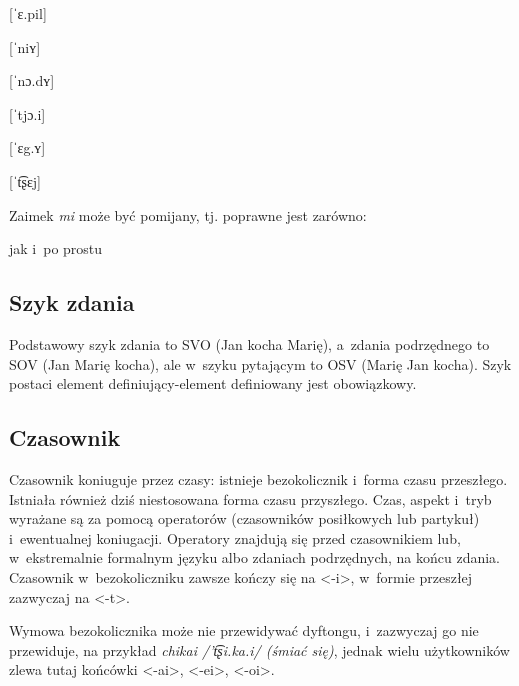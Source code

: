 \begin{spacing}{1.1}
\begin{multicols}{2}
[ˈɛ.pil]

[ˈniʏ]

[ˈnɔ.dʏ]

[ˈtjɔ.i]

[ˈɛg.ʏ]

[ˈt͡ʂɛj]

\end{multicols}

\noindent
Zaimek \emph{mi} może być pomijany, tj. poprawne jest zarówno: 


\noindent
jak i~po prostu


\subsection{Szyk zdania}

Podstawowy szyk zdania to SVO (Jan kocha Marię), a~zdania podrzędnego to SOV 
(Jan Marię kocha), ale w~szyku pytającym to OSV (Marię Jan kocha). Szyk postaci 
element definiujący-element definiowany jest obowiązkowy.

\subsection{Czasownik}

Czasownik koniuguje przez czasy: istnieje bezokolicznik i~forma czasu 
przeszłego. Istniała również dziś niestosowana forma czasu przyszłego. Czas, 
aspekt i~tryb wyrażane są za pomocą operatorów (czasowników posiłkowych lub 
partykuł) i~ewentualnej koniugacji. Operatory znajdują się przed czasownikiem 
lub, w~ekstremalnie formalnym języku albo zdaniach podrzędnych, na końcu zdania.
 Czasownik w~bezokoliczniku zawsze kończy się na <-i>, w~formie przeszłej
  zazwyczaj na <-t>.

Wymowa bezokolicznika może nie przewidywać dyftongu, i~zazwyczaj go nie przewiduje,
na przykład \emph{chikai /'t͡ʂi.ka.i/ (śmiać się)}, jednak wielu użytkowników 
zlewa tutaj końcówki <-ai>, <-ei>, <-oi>.

\skipline


\end{spacing}
